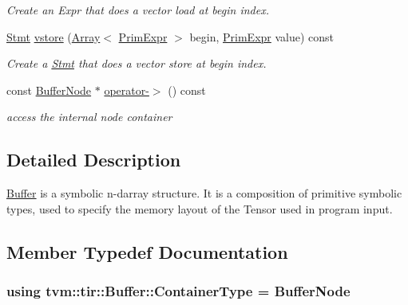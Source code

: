 \begin{DoxyCompactItemize}
\begin{DoxyCompactList}\small\item\em Create an Expr that does a vector load at begin index. \end{DoxyCompactList}\item 
\hyperlink{classtvm_1_1tir_1_1Stmt}{Stmt} \hyperlink{classtvm_1_1tir_1_1Buffer_a9ea73d1913c16bcd7c1417a202c05bc3}{vstore} (\hyperlink{classtvm_1_1Array}{Array}$<$ \hyperlink{classtvm_1_1PrimExpr}{Prim\+Expr} $>$ begin, \hyperlink{classtvm_1_1PrimExpr}{Prim\+Expr} value) const 
\begin{DoxyCompactList}\small\item\em Create a \hyperlink{classtvm_1_1tir_1_1Stmt}{Stmt} that does a vector store at begin index. \end{DoxyCompactList}\item 
const \hyperlink{classtvm_1_1tir_1_1BufferNode}{Buffer\+Node} $\ast$ \hyperlink{classtvm_1_1tir_1_1Buffer_a5f3eca6b64a0cc6f1be7d50224c217c4}{operator-\/$>$} () const 
\begin{DoxyCompactList}\small\item\em access the internal node container \end{DoxyCompactList}\end{DoxyCompactItemize}


\subsection{Detailed Description}
\hyperlink{classtvm_1_1tir_1_1Buffer}{Buffer} is a symbolic n-\/darray structure. It is a composition of primitive symbolic types, used to specify the memory layout of the Tensor used in program input. 

\subsection{Member Typedef Documentation}
\subsubsection[{\texorpdfstring{Container\+Type}{ContainerType}}]{\setlength{\rightskip}{0pt plus 5cm}using {\bf tvm\+::tir\+::\+Buffer\+::\+Container\+Type} =  {\bf Buffer\+Node}}\hypertarget{classtvm_1_1tir_1_1Buffer_aba3e2da6a30d5495fb89307b8db2926a}{}\label{classtvm_1_1tir_1_1Buffer_aba3e2da6a30d5495fb89307b8db2926a}


